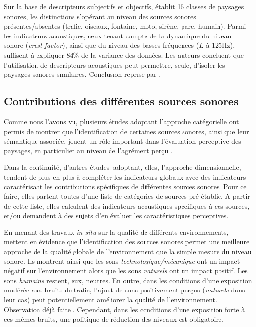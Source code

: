 Sur la base de descripteurs subjectifs et objectifs, \citep{torija2013application} établit 15 classes de paysages sonores, les distinctions s'opérant au niveau des sources sonores présentes/absentes (trafic, oiseaux, fontaine, moto, sirène, parc, humain). Parmi les indicateurs acoustiques, ceux tenant compte de la dynamique du niveau sonore (\emph{crest factor}), ainsi que du niveau des basses fréquences ($L$ à 125Hz), suffisent à expliquer 84\% de la variance des données. Les auteurs concluent que l'utilisation de descripteurs acoustiques peut permettre, seule, d'isoler les paysages sonores similaires. Conclusion reprise par \citep{rychtarikova2013soundscape}.

\subsection{Contributions des différentes sources sonores}
\label{sec:ch3_contribSource}

Comme nous l'avons vu, plusieurs études adoptant l'approche catégorielle ont permis de montrer que l'identification de certaines sources sonores, ainsi que leur sémantique associée, jouent un rôle important dans l'évaluation perceptive des paysages, en particulier au niveau de l'agrément perçu \citep{defreville2004aactivity,guastavino2006ideal,nilsson2007soundscape,szeremeta2009analysis,gozalo2015relationship}.

Dans la continuité, d'autres études, adoptant, elles, l'approche dimensionnelle, tendent de plus en plus à compléter les indicateurs globaux avec des indicateurs caractérisant les contributions spécifiques de différentes sources sonores. Pour ce faire, elles partent toutes d'une liste de catégories de sources pré-établie. A partir de cette liste, elles calculent des indicateurs acoustiques spécifiques à ces sources, et/ou demandent à des sujets d'en évaluer les caractéristiques perceptives.

En menant des travaux \emph{in situ} sur la qualité de différents environnements, \citep{nilsson2007acoustic,nilsson2007soundscape} mettent en évidence que l'identification des sources sonores permet une meilleure approche de la qualité globale de l'environnement que la simple mesure du niveau sonore. Ils montrent ainsi que les sons \emph{technologique/mécanique} ont un impact négatif sur l'environnement alors que les sons \emph{naturels} ont un impact positif. Les sons \emph{humains} restent, eux, neutres. En outre, dans les conditions d'une exposition modérée aux bruits de trafic, l'ajout de sons positivement perçus (\emph{naturels} dans leur cas) peut potentiellement améliorer la qualité de l'environnement. Observation déjà faite \citep{hong2013designing,galbrun2012perceptual}. Cependant, dans les conditions d'une exposition forte à ces mêmes bruits, une politique de réduction des niveaux est obligatoire.

